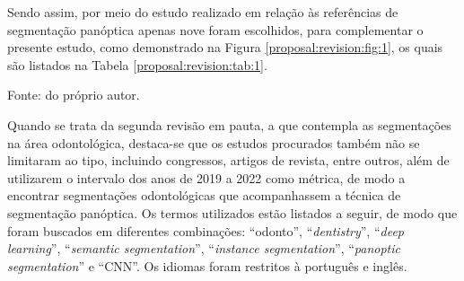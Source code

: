 Sendo assim, por meio do estudo realizado em relação às referências de segmentação panóptica apenas nove foram escolhidos, para complementar o presente estudo, como demonstrado na Figura \ref{proposal:revision:fig:1}, os quais são listados na Tabela \ref{proposal:revision:tab:1}.

\begin{table}[H]
    \centering
    \caption{Trabalhos selecionados a partir da revisão sobre segmentação panóptica.}
    \label{proposal:revision:tab:1}

    \vspace*{1 cm}
    Fonte: do próprio autor.
\end{table}

Quando se trata da segunda revisão em pauta, a que contempla as segmentações na área odontológica, destaca-se que os estudos procurados também não se limitaram ao tipo, incluindo congressos, artigos de revista, entre outros, além de utilizarem o intervalo dos anos de 2019 a 2022 como métrica, de modo a encontrar segmentações odontológicas que acompanhassem a técnica de segmentação panóptica. Os termos utilizados estão listados a seguir, de modo que foram buscados em diferentes combinações: ``odonto'', ``\textit{dentistry}'', ``\textit{deep learning}'', ``\textit{semantic segmentation}'', ``\textit{instance segmentation}'', ``\textit{panoptic segmentation}'' e ``CNN''. Os idiomas foram restritos à português e inglês.

